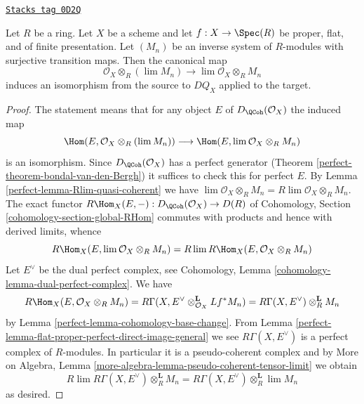 \begin{lemma}
\label{perfect-lemma-pullback-and-limits}
\href{https://stacks.math.columbia.edu/tag/0D2Q}{\texttt{Stacks tag 0D2Q}}

Let $R$ be a ring. Let $X$ be a scheme and let
$f : X \to \Spec(R)$ be proper, flat, and
of finite presentation. Let $(M_n)$ be an inverse
system of $R$-modules with surjective transition maps.
Then the canonical map
$$
\mathcal{O}_X \otimes_R (\lim M_n)
\longrightarrow
\lim \mathcal{O}_X \otimes_R M_n
$$
induces an isomorphism from the source to $DQ_X$ applied to the target.
\end{lemma}

\begin{proof}

The statement means that for any object $E$ of
$D_\QCoh(\mathcal{O}_X)$ the induced map
$$
\Hom(E, \mathcal{O}_X \otimes_R (\lim M_n))
\longrightarrow
\Hom(E, \lim \mathcal{O}_X \otimes_R M_n)
$$
is an isomorphism. Since $D_\QCoh(\mathcal{O}_X)$ has
a perfect generator (Theorem \ref{perfect-theorem-bondal-van-den-Bergh})
it suffices to check this for perfect $E$.
By Lemma \ref{perfect-lemma-Rlim-quasi-coherent} we have
$\lim \mathcal{O}_X \otimes_R M_n = R\lim \mathcal{O}_X \otimes_R M_n$.
The exact functor
$R\Hom_X(E, -) : D_\QCoh(\mathcal{O}_X) \to D(R)$
of Cohomology, Section \ref{cohomology-section-global-RHom}
commutes with products and hence with derived limits, whence
$$
R\Hom_X(E, \lim \mathcal{O}_X \otimes_R M_n) =
R\lim R\Hom_X(E, \mathcal{O}_X \otimes_R M_n)
$$
Let $E^\vee$ be the dual perfect complex, see
Cohomology, Lemma \ref{cohomology-lemma-dual-perfect-complex}.
We have
$$
R\Hom_X(E, \mathcal{O}_X \otimes_R M_n) =
R\Gamma(X, E^\vee \otimes_{\mathcal{O}_X}^\mathbf{L} Lf^*M_n) =
R\Gamma(X, E^\vee) \otimes_R^\mathbf{L} M_n
$$
by Lemma \ref{perfect-lemma-cohomology-base-change}.
From Lemma \ref{perfect-lemma-flat-proper-perfect-direct-image-general}
we see $R\Gamma(X, E^\vee)$ is a perfect complex of $R$-modules.
In particular it is a pseudo-coherent complex and by
More on Algebra, Lemma \ref{more-algebra-lemma-pseudo-coherent-tensor-limit}
we obtain
$$
R\lim R\Gamma(X, E^\vee) \otimes_R^\mathbf{L} M_n =
R\Gamma(X, E^\vee) \otimes_R^\mathbf{L} \lim M_n
$$
as desired.
\end{proof}

